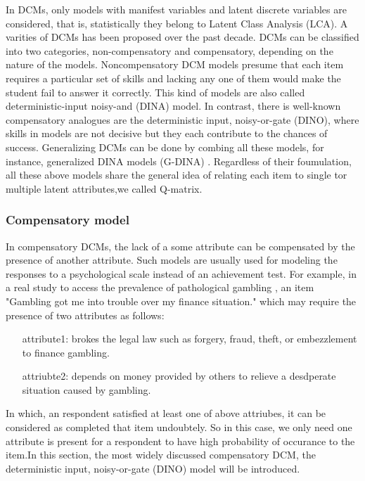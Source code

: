 \documentclass[11pt]{article}
\begin{document}
In DCMs, only models with manifest variables and latent discrete variables are considered, that is, statistically they belong to Latent Class Analysis (LCA). A varities of DCMs has been proposed over the past decade. DCMs can be classified into two categories, non-compensatory and compensatory, depending on the nature of the models. Noncompensatory DCM models presume that each item requires a particular set of skills and lacking any one of them would make the student fail to answer it correctly. This kind of models are also called deterministic-input noisy-and (DINA) model\cite{de2009dina}. In contrast, there is well-known compensatory analogues are the deterministic input, noisy-or-gate (DINO)\cite{templin2006measurement}, where skills in models are not decisive but they each contribute to the chances of success. Generalizing DCMs can be done by combing all these models, for instance,  generalized DINA models (G-DINA) \cite{de2011generalized}. Regardless of their foumulation, all these above models share the general idea of relating each item to single tor multiple latent attributes,we called Q-matrix.
\subsubsection{Compensatory model}

 In compensatory DCMs, the lack of a some attribute can be
compensated by the presence of another attribute. Such models are usually
used for modeling the responses to a psychological scale instead of an achievement test.
For example, in a real study to access the prevalence of pathological gambling \cite{templin2010diagnostic}, an item "Gambling got me into trouble over my finance
situation." which may require the presence of two attributes as follows:
\begin{itemize}
	\item[attribute1:] brokes the legal law such as forgery, fraud, theft, or embezzlement to finance gambling.
	\item[attriubte2:] depends on money provided by others to relieve a desdperate situation caused by gambling.	
\end{itemize}

 
In which, an respondent satisfied at least one of above attriubes, it can be considered as completed that item undoubtely. So in this case, we only need one attribute is present for a respondent to have high probability of occurance to the item.In this section, the most widely discussed compensatory DCM, the deterministic input, noisy-or-gate (DINO) model \cite{templin2006measurement} will be introduced. 
\end{document}
